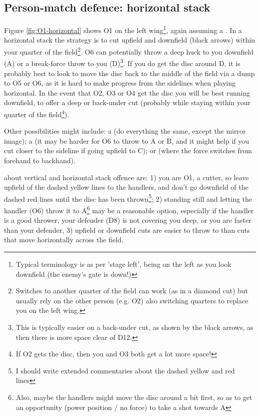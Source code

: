 \documentclass{tufte-handout}
\begin{document}
\subsection{Person-match defence: horizontal stack}\label{sec:horizontall}
Figure \ref{fig:O1-horizontal} shows 
O1 on the left wing\footnote{
Typical terminology is 
as per 'stage left',
being on the left as you look downfield 
(the enemy's gate is down!)}, 
again assuming a .
In a horizontal stack 
the strategy is to cut 
upfield and downfield (black arrows)
within your quarter of the field\footnote{
Switches to 
another quarter of the field 
can work 
(as in a diamond cut)
but usually rely on the 
other person 
(e.g. O2) 
also switching quarters 
to replace you 
on the left wing.}. 
O6 can potentially throw 
a deep huck to you downfield (A)
or a break-force throw to you (D)\footnote{
This is typically easier 
on a back-under cut, 
as shown by the black arrows,
as then there is more space 
clear of D12.}.
If you do get the disc around D, 
it is probably best 
to look to move the disc 
back to the middle of the field 
via a dump to O5 or O6, 
as it is hard to 
make progress from the sidelines 
when playing horizontal. 
In the event that 
O2, O3 or O4 
get the disc
you will be best running downfield,
to offer a deep 
or back-under cut
(probably while staying within your quarter of the field\footnote{
If O2 gets the disc,
then you
and O3 
both get a lot more space!}).


Other possibilities might include: 
a 
(do everything the same, except the mirror image); 
a 
(it may be harder for O6 to throw to A or B, 
and it might help if 
you cut closer to the sideline 
if going upfield to C); or
(where the force switches 
from forehand to backhand).




about vertical 
and horizontal 
stack offence 
are: 
1) you are O1, 
a cutter, 
so leave upfield of the dashed yellow lines to the handlers,
and don't go downfield of the dashed red lines 
until the disc has been thrown\footnote{
I should write extended commentaries about 
the dashed yellow 
and red lines}; 
2) standing still and letting the handler (O6) 
throw it to A\footnote{
Also, maybe the handlers might move the disc around a bit first, 
so as to get an opportunity (power position / no force) 
to take a shot towards A}
may be a reasonable option, 
especially if the handler is a good thrower, 
your defender (D8) is not 
covering you deep, or
you are faster than your defender, 
3) upfield or downfield cuts are easier to throw to
than cuts that move horizontally across the field.
\end{document}
